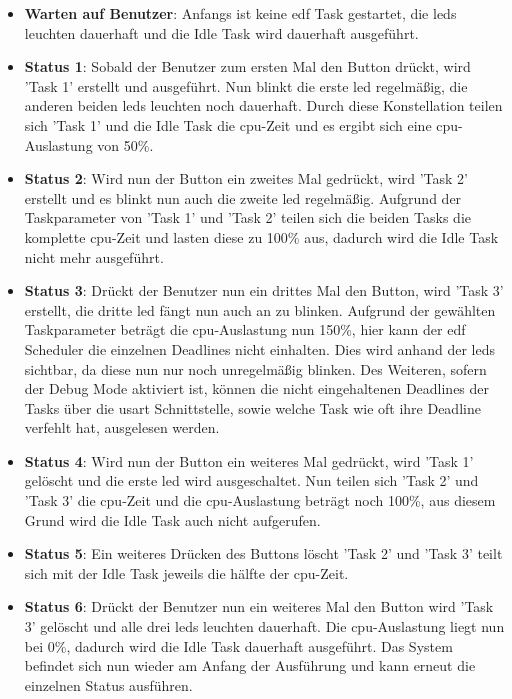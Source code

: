 \documentclass[../EDF Master Thesis.tex]{subfiles}
\begin{document}
        \begin{itemize}
            \item \textbf{Warten auf Benutzer}: Anfangs ist keine \ac{edf} Task gestartet, die \ac{led}s leuchten dauerhaft und die Idle Task wird dauerhaft ausgeführt.
            \item \textbf{Status 1}: Sobald der Benutzer zum ersten Mal den Button drückt, wird 'Task 1' erstellt und ausgeführt.
                Nun blinkt die erste \ac{led} regelmäßig, die anderen beiden \ac{led}s leuchten noch dauerhaft.
                Durch diese Konstellation teilen sich 'Task 1' und die Idle Task die \ac{cpu}-Zeit und es ergibt sich eine \ac{cpu}-Auslastung von 50\%.
            \item \textbf{Status 2}: Wird nun der Button ein zweites Mal gedrückt, wird 'Task 2' erstellt und es blinkt nun auch die zweite \ac{led} regelmäßig.
                Aufgrund der Taskparameter von 'Task 1' und 'Task 2' teilen sich die beiden Tasks die komplette \ac{cpu}-Zeit und lasten diese zu 100\% aus, dadurch wird die Idle Task nicht mehr ausgeführt.
            \item \textbf{Status 3}: Drückt der Benutzer nun ein drittes Mal den Button, wird 'Task 3' erstellt, die dritte \ac{led} fängt nun auch an zu blinken.
                Aufgrund der gewählten Taskparameter beträgt die \ac{cpu}-Auslastung nun 150\%, hier kann der \ac{edf} Scheduler die einzelnen Deadlines nicht einhalten.
                Dies wird anhand der \ac{led}s sichtbar, da diese nun nur noch unregelmäßig blinken.
                Des Weiteren, sofern der Debug Mode aktiviert ist, können die nicht eingehaltenen Deadlines der Tasks über die \ac{usart} Schnittstelle, sowie welche Task wie oft ihre Deadline verfehlt hat, ausgelesen werden.
            \item \textbf{Status 4}: Wird nun der Button ein weiteres Mal gedrückt, wird 'Task 1' gelöscht und die erste \ac{led} wird ausgeschaltet.
                Nun teilen sich 'Task 2' und 'Task 3' die \ac{cpu}-Zeit und die \ac{cpu}-Auslastung beträgt noch 100\%, aus diesem Grund wird die Idle Task auch nicht aufgerufen.
            \item \textbf{Status 5}: Ein weiteres Drücken des Buttons löscht 'Task 2' und 'Task 3' teilt sich mit der Idle Task jeweils die hälfte der \ac{cpu}-Zeit.
            \item \textbf{Status 6}: Drückt der Benutzer nun ein weiteres Mal den Button wird 'Task 3' gelöscht und alle drei \ac{led}s leuchten dauerhaft.
                Die \ac{cpu}-Auslastung liegt nun bei 0\%, dadurch wird die Idle Task dauerhaft ausgeführt.
                Das System befindet sich nun wieder am Anfang der Ausführung und kann erneut die einzelnen Status ausführen.
        \end{itemize}
\end{document}
